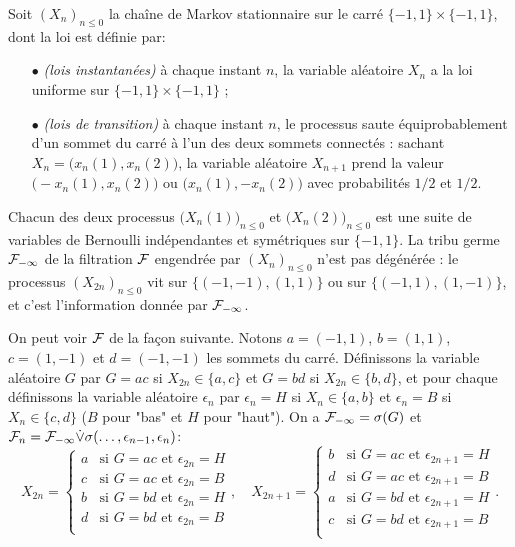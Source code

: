\documentclass[12pt,a4paper]{article}
\begin{document}
\begin{exemple}
Soit ${(X_n)}_{n \leq 0}$ la chaîne de Markov stationnaire sur le carré 
$\{-1,1\}\times\{-1,1\}$, dont la loi est définie par:
\begin{itemize}
\item[$\bullet$] \emph{(lois instantanées)} à chaque instant $n$, la variable aléatoire 
$X_n$ a la loi uniforme sur $\{-1,1\}\times\{-1,1\}$ ;

\item[$\bullet$] \emph{(lois de transition)} à chaque instant $n$, le processus 
saute équiprobablement d'un sommet du carré à l'un des deux sommets connectés : 
sachant $X_n=\bigl(x_n(1), x_n(2)\bigr)$, la variable aléatoire $X_{n+1}$ 
prend la valeur $\bigl(-x_n(1), x_n(2)\bigr)$ ou $\bigl(x_n(1), -x_n(2)\bigr)$ avec 
probabilités $1/2$ et $1/2$. 
\end{itemize}
Chacun des deux processus ${\bigl(X_n(1)\bigr)}_{n \leq 0}$ et ${\bigl(X_n(2)\bigr)}_{n \leq 0}$ 
est une suite de variables de Bernoulli indépendantes et symétriques sur $\{-1,1\}$. 
La tribu germe $\mathcal{F}_{-\infty}$ de la filtration $\mathcal{F}$ engendrée par 
${(X_n)}_{n \leq 0}$ n'est pas dégénérée : le processus ${(X_{2n})}_{n \leq 0}$ 
vit sur $\bigl\{(-1,-1), (1,1)\bigr\}$ ou sur $\bigl\{(-1,1), (1,-1)\bigr\}$, 
et c'est l'information donnée par $\mathcal{F}_{-\infty}$. 

On peut voir $\mathcal{F}$ de la façon suivante. 
Notons $a=(-1,1)$, $b=(1,1)$, $c=(1,-1)$ et $d=(-1,-1)$ les sommets du carré. 
Définissons la variable aléatoire $G$ par $G=ac$ si $X_{2n} \in \{a,c\}$ et 
$G=bd$ si  $X_{2n} \in \{b,d\}$, et pour chaque définissons 
la variable aléatoire $\epsilon_n$ par $\epsilon_n=H$ si $X_n \in \{a,b\}$ 
et $\epsilon_n=B$ si $X_n \in \{c,d\}$  ($B$ pour "bas" et $H$ pour "haut"). 
On a $\mathcal{F}_{-\infty} = \sigma(G)$ et 
$\mathcal{F}_n = \mathcal{F}_{-\infty} \dot{\vee} \sigma(\ldots, \epsilon_{n-1}, \epsilon_n)$:
$$
X_{2n} = \begin{cases}
a & \text{si $G=ac$ et $\epsilon_{2n}=H$} \\
c & \text{si $G=ac$ et $\epsilon_{2n}=B$} \\
b & \text{si $G=bd$ et $\epsilon_{2n}=H$} \\
d & \text{si $G=bd$ et $\epsilon_{2n}=B$} \\
\end{cases},
\quad
X_{2n+1} = \begin{cases}
b & \text{si $G=ac$ et $\epsilon_{2n+1}=H$} \\
d & \text{si $G=ac$ et $\epsilon_{2n+1}=B$} \\
a & \text{si $G=bd$ et $\epsilon_{2n+1}=H$} \\
c & \text{si $G=bd$ et $\epsilon_{2n+1}=B$} \\
\end{cases}.
$$
 
%


\end{exemple}
\end{document}

